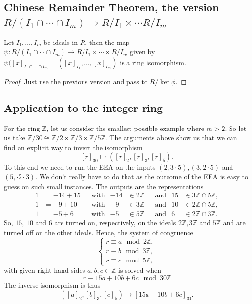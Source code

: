 \documentclass[11pt,a4paper]{amsart}
\newcommand{\Z}{{\mathbb{Z}}}
\begin{document}
\subsection{Chinese Remainder Theorem, the version $R / (I_1 \cap \cdots \cap I_m) \to R / I_1 \times \cdots R / I_m$}  Let $I_1,\ldots,I_m$ be ideals in $R$, then the map $\psi : R / (I_1 \cap \cdots \cap I_m) \to R / I_1 \times \cdots \times R / I_m$ given by $\psi( [x]_{I_1 \cap \cdots \cap I_m} = ([x]_{I_1},\ldots, [x]_{I_m})$ is a ring isomorphism. 

\begin{proof} Just use the previous version and pass to $ R / \ker \phi$. 
\end{proof} 

\subsection{Application to the integer ring} For the ring $\Z$, let us consider the smallest possible example where $m > 2$. So let us take $ \Z / 30 \cong\Z /2 \times \Z / 3 \times \Z / 5 \Z$. The arguments above show us that we can find an explicit way to invert the isomorphism 
\[
	[r]_{30} \mapsto ([r]_2,[r]_3,[r]_5). 
\]
To this end we need to run the EEA on the inputs $(2, 3 \cdot 5), (3, 2 \cdot 5)$ and $(5, \cdot 2 \cdot 3)$. We don't really have to do that as the outcome of the EEA is easy to guess on such small instances. The outputs are the representations 
\begin{align*} 
	1 & = -14 + 15 & & \text{with} & -14 & \in 2 \Z & & \text{and} & 15 & \in 3 \Z \cap 5 \Z,
\\
	1 & = -9 + 10 & & \text{with} & -9 & \in 3 \Z & & \text{and} & 10 & \in 2 \Z \cap 5\Z,
\\
	1 & = -5 + 6 & & \text{with} & -5 & \in 5 \Z & & \text{and} & 6 & \in 2 \Z \cap 3 \Z. 
\end{align*} 
So, $15$, $10$ and $6$ are turned on, respectively, on the ideals $2 \Z, 3 \Z$ and $5 \Z$ and are turned off on the other ideals. Hence, the system of congruence
\[
	\begin{cases}
		r  \equiv a \mod 2 \Z, 
\\		r  \equiv b \mod 3 \Z,
\\		r  \equiv c \mod 5 \Z,
	\end{cases} 
\]
with given right hand sides $a,b,c \in \Z$
is solved when
\[
	r \equiv 15 a + 10 b + 6 c \mod 30 \Z
\]
The inverse isomorphism is thus
\[
	([a]_2, [b]_3, [c]_5) \mapsto [15 a + 10 b + 6 c]_{30}. 
\]
\end{document}
